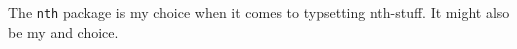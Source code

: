\documentclass[a5paper]{scrartcl}
\begin{document}
    The \verb+nth+ package is my  choice when it comes to typsetting
    nth-stuff. It might also be my  and  choice.
\end{document}
